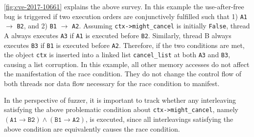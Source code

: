 \autoref{fig:cve-2017-10661} explains the above survey. In this
example the use-after-free bug is triggered if two execution orders
are conjunctively fulfilled such that 1) \texttt{A1} $\rightarrow$
\texttt{B2}, and 2) \texttt{B1} $\rightarrow$ \texttt{A2}.
%
Assuming \texttt{ctx->might_cancel} is initially \texttt{False},
thread A always executes \texttt{A3} if \texttt{A1} is executed before
\texttt{B2}. Similarly, thread B always executes \texttt{B3} if
\texttt{B1} is executed before \texttt{A2}. Therefore, if the two
conditions are met, the object \texttt{ctx} is inserted into a linked
list \texttt{cancel_list} at both \texttt{A3} and \texttt{B3}, causing
a list corruption.
%
In this example, all other memory accesses do not affect the
manifestation of the race condition. They do not change the control
flow of both threads nor data flow necessary for the race condition to
manifest.

In the perspective of fuzzer, it is important to track whether any
interleaving satisfying the above problematic condition about
\texttt{ctx->might_cancel}, namely
$(\texttt{A1} \rightarrow \texttt{B2}) \wedge (\texttt{B1} \rightarrow
\texttt{A2})$, is executed, since all interleavings satisfying the
above condition are equivalently causes the race condition.








